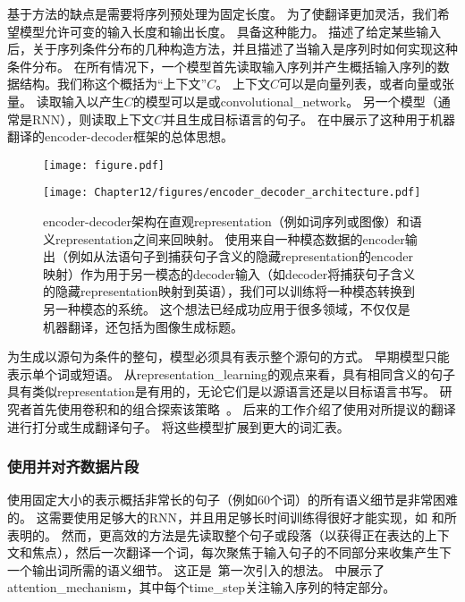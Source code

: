 基于方法的缺点是需要将序列预处理为固定长度。
为了使翻译更加灵活，我们希望模型允许可变的输入长度和输出长度。
具备这种能力。
描述了给定某些输入后，关于序列条件分布的几种构造方法，并且描述了当输入是序列时如何实现这种条件分布。
在所有情况下，一个模型首先读取输入序列并产生概括输入序列的数据结构。我们称这个概括为``上下文''$C$。
上下文$C$可以是向量列表，或者向量或张量。
读取输入以产生$C$的模型可以是\citep{Cho-et-al-EMNLP2014,Sutskever-et-al-NIPS2014,Jean-et-al-arxiv2014}或\gls{convolutional_network}\citep{Kalchbrenner+Blunsom-EMNLP2013}。
另一个模型（通常是RNN），则读取上下文$C$并且生成目标语言的句子。
在中展示了这种用于机器翻译的\gls{encoder}-\gls{decoder}框架的总体思想。


\begin{figure}[htp]
\ifOpenSource
\centerline{\texttt{[image: figure.pdf]}}
\else
\centerline{\texttt{[image: Chapter12/figures/encoder\_decoder\_architecture.pdf]}}
\fi
\caption{\gls{encoder}-\gls{decoder}架构在直观\gls{representation}（例如词序列或图像）和语义\gls{representation}之间来回映射。
使用来自一种模态数据的\gls{encoder}输出（例如从法语句子到捕获句子含义的隐藏\gls{representation}的\gls{encoder}映射）作为用于另一模态的\gls{decoder}输入（如\gls{decoder}将捕获句子含义的隐藏\gls{representation}映射到英语），我们可以训练将一种模态转换到另一种模态的系统。
这个想法已经成功应用于很多领域，不仅仅是机器翻译，还包括为图像生成标题。
}
\label{fig:chap12_encoder_decoder_architecture}
\end{figure}

为生成以源句为条件的整句，模型必须具有表示整个源句的方式。 
早期模型只能表示单个词或短语。
从\gls{representation_learning}的观点来看，具有相同含义的句子具有类似\gls{representation}是有用的，无论它们是以源语言还是以目标语言书写。
研究者首先使用卷积和的组合探索该策略~\citep{Kalchbrenner+Blunsom-EMNLP2013}。
后来的工作介绍了使用对所提议的翻译进行打分\citep{Cho-et-al-EMNLP2014}或生成翻译句子\citep{Sutskever-et-al-NIPS2014}。
\cite{Jean-et-al-arxiv2014}将这些模型扩展到更大的词汇表。


\subsubsection{使用并对齐数据片段}
\label{sec:using_an_attention_mechanism_and_aligning_pieces_of_data}
使用固定大小的表示概括非常长的句子（例如60个词）的所有语义细节是非常困难的。 
这需要使用足够大的RNN，并且用足够长时间训练得很好才能实现，如 \citet{Cho-et-al-EMNLP2014}和\citet{Sutskever-et-al-NIPS2014}所表明的。
然而，更高效的方法是先读取整个句子或段落（以获得正在表达的上下文和焦点），然后一次翻译一个词，每次聚焦于输入句子的不同部分来收集产生下一个输出词所需的语义细节。
这正是~\citet{Bahdanau-et-al-ICLR2015-small}第一次引入的想法。
中展示了\gls{attention_mechanism}，其中每个\gls{time_step}关注输入序列的特定部分。

